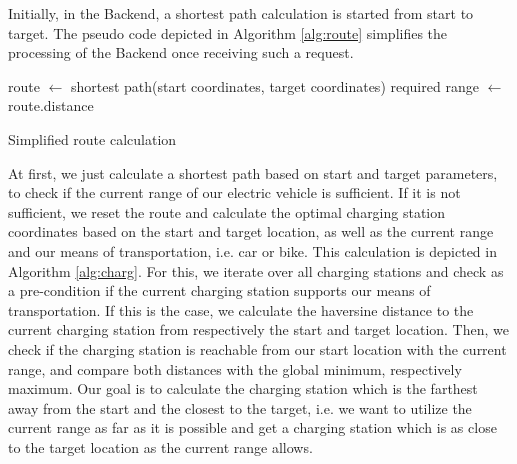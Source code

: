 \documentclass[a4paper]{article}
\begin{document}
Initially, in the Backend, a shortest path calculation is started from start to target.
The pseudo code depicted in Algorithm \ref{alg:route} simplifies the processing of the Backend once receiving such a request.\par\bigskip
\begin{algorithm}[H]
route $\leftarrow$  shortest path(start coordinates, target coordinates)\;
required range $\leftarrow$ route.distance\;
 \caption{Simplified route calculation}
 \label{alg:route}
\end{algorithm}\par\bigskip
At first, we just calculate a shortest path based on start and target parameters, to check if the current range of our electric vehicle is sufficient.
If it is not sufficient, we reset the route and calculate the optimal charging station coordinates based on the start and target location, as well as the current range and our means of transportation, i.e. car or bike.
This calculation is depicted in Algorithm \ref{alg:charg}. 
For this, we iterate over all charging stations and check as a pre-condition if the current charging station supports our means of transportation.
If this is the case, we calculate the haversine distance to the current charging station from respectively the start and target location.
Then, we check if the charging station is reachable from our start location with the current range, and compare both distances with the global minimum, respectively maximum. 
Our goal is to calculate the charging station which is the farthest away from the start and the closest to the target, i.e. we want to utilize the current range as far as it is possible and get a charging station which is as close to the target location as the current range allows.
\end{document}
